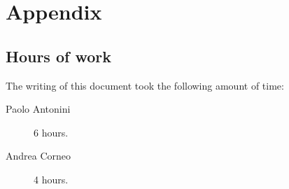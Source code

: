 \chapter{Appendix}\label{chap:appendix}

\section*{Hours of work}
The writing of this document took the following amount of time:

\begin{description}
	\item [Paolo Antonini] 6 hours.
	\item [Andrea Corneo] 4 hours.
\end{description}



